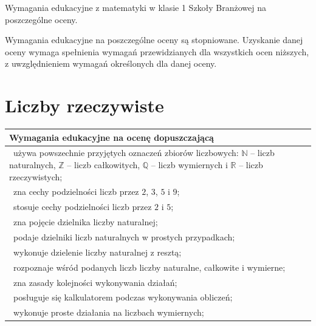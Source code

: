 \documentclass[12pt,a4paper]{article}
\begin{document}
	
	\begin{center}
		\Large Wymagania edukacyjne z matematyki w klasie 1 Szkoły Branżowej na poszczególne oceny.
	\end{center}
	
	Wymagania edukacyjne na poszczególne oceny są stopniowane.
	Uzyskanie danej oceny wymaga spełnienia wymagań przewidzianych
	dla wszystkich ocen niższych, z uwzględnieniem wymagań
	określonych dla danej oceny.
	
	\section{Liczby rzeczywiste}
	
	\begin{longtable}{|p{16cm}|}
		\hline
		
		\textbf{Wymagania edukacyjne na ocenę dopuszczającą} \\ \hline
		
		\textbullet\ używa powszechnie przyjętych oznaczeń zbiorów liczbowych: $\mathbb{N}$ – liczb naturalnych, $\mathbb{Z}$ – liczb całkowitych, $\mathbb{Q}$ – liczb wymiernych i $\mathbb{R}$ – liczb rzeczywistych; \\
		
		\textbullet\ zna cechy podzielności liczb przez $2$, $3$, $5$ i $9$; \\
		
		\textbullet\ stosuje cechy podzielności liczb przez $2$ i $5$; \\
		
		\textbullet\ zna pojęcie dzielnika liczby naturalnej; \\
		
		\textbullet\ podaje dzielniki liczb naturalnych w prostych przypadkach; \\
		
		\textbullet\ wykonuje dzielenie liczby naturalnej z resztą; \\
		
		\textbullet\ rozpoznaje wśród podanych liczb liczby naturalne, całkowite i wymierne; \\
		
		\textbullet\ zna zasady kolejności wykonywania działań; \\
		
		\textbullet\ posługuje się kalkulatorem podczas wykonywania obliczeń; \\
		
		\textbullet\ wykonuje proste działania na liczbach wymiernych; \\
		

\end{longtable}
\end{document}
